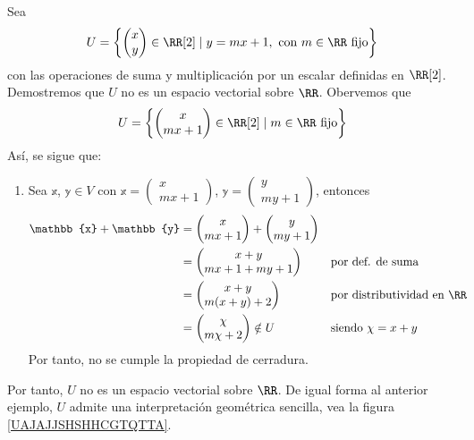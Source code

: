 \begin{examplebox}{}{}
    Sea
    $$\displaystyle U = \left\{ \begin{pmatrix}
        x \\
        y
    \end{pmatrix} \in \RR[2] \mid y = mx+1, \text{ con }  m \in \RR \text{ fijo} \right\}$$
    con las operaciones de suma y multiplicación por un escalar definidas en $\RR[2]$. Demostremos que $U$ no es un espacio vectorial sobre $\RR$. Obervemos que
    $$U = \left\{ \begin{pmatrix}
        x \\
        mx + 1
    \end{pmatrix} \in \RR[2] \mid m \in \RR \text{ fijo} \right\}$$
    Así, se sigue que:
    \begin{enumerate}[label=\roman*), topsep=6pt, itemsep=0pt]
        \item Sea $\mathbb{x}$, $\mathbb{y} \in V$ con $\mathbb{x} = \begin{pmatrix}
            x \\
            mx + 1
        \end{pmatrix}$, $\mathbb{y} = \begin{pmatrix}
            y \\
            my + 1
        \end{pmatrix}$, entonces
        \begin{align*}
            \mathbb{x} + \mathbb{y} & = \begin{pmatrix}
                x \\
                mx + 1
            \end{pmatrix} + \begin{pmatrix}
                y \\
                my + 1
            \end{pmatrix} \\
            & = \begin{pmatrix}
                x + y \\
                mx + 1 + my + 1
            \end{pmatrix} && \text{por def. de suma} \\
            & = \begin{pmatrix}
                x + y \\
                m(x + y) + 2
            \end{pmatrix} && \text{por distributividad en $\RR$} \\
            & = \begin{pmatrix}
                \chi \\
                m\chi + 2
            \end{pmatrix} \notin U && \text{siendo $\chi = x + y$}
        \end{align*}
        Por tanto, no se cumple la propiedad de cerradura.
    \end{enumerate}
    Por tanto, $U$ no es un espacio vectorial sobre $\RR$. De igual forma al anterior ejemplo, $U$ admite una interpretación geométrica sencilla, vea la figura \ref{UAJAJJSHSHHCGTQTTA}.
\end{examplebox}

